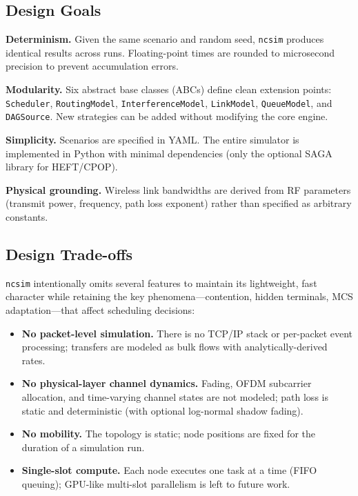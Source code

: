 \documentclass[conference]{IEEEtran}
\newcommand{\ncsim}{\texttt{ncsim}}
\begin{document}
\subsection{Design Goals}

\textbf{Determinism.}  Given the same scenario and random seed, \ncsim{}
produces identical results across runs.  Floating-point times are rounded to
microsecond precision to prevent accumulation errors.

\textbf{Modularity.}  Six abstract base classes (ABCs) define clean extension
points: \texttt{Scheduler}, \texttt{RoutingModel}, \texttt{InterferenceModel},
\texttt{LinkModel}, \texttt{QueueModel}, and \texttt{DAGSource}.  New
strategies can be added without modifying the core engine.

\textbf{Simplicity.}  Scenarios are specified in YAML.  The entire simulator
is implemented in Python with minimal dependencies (only the optional SAGA
library for HEFT/CPOP).

\textbf{Physical grounding.}  Wireless link bandwidths are derived from RF
parameters (transmit power, frequency, path loss exponent) rather than
specified as arbitrary constants.

\subsection{Design Trade-offs}

\ncsim{} intentionally omits several features to maintain its lightweight,
fast character while retaining the key phenomena---contention, hidden
terminals, MCS adaptation---that affect scheduling decisions:

\begin{itemize}[itemsep=1pt,leftmargin=*]
\item \textbf{No packet-level simulation.}  There is no TCP/IP stack or
  per-packet event processing; transfers are modeled as bulk flows with
  analytically-derived rates.
\item \textbf{No physical-layer channel dynamics.}  Fading, OFDM subcarrier
  allocation, and time-varying channel states are not modeled; path loss is
  static and deterministic (with optional log-normal shadow fading).
\item \textbf{No mobility.}  The topology is static; node positions are fixed
  for the duration of a simulation run.
\item \textbf{Single-slot compute.}  Each node executes one task at a time
  (FIFO queuing); GPU-like multi-slot parallelism is left to future work.
\end{itemize}
\end{document}
